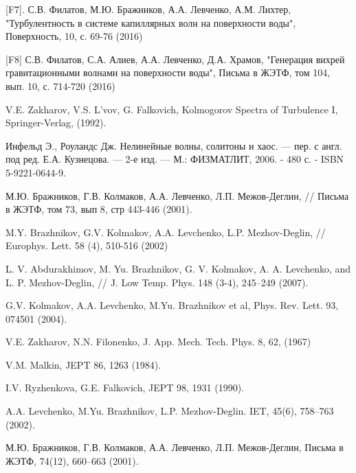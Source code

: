 [F7]. С.В. Филатов, М.Ю. Бражников, А.А. Левченко,  А.М. Лихтер, "Турбулентность в системе капиллярных волн на поверхности воды", Поверхность, 10, с. 69-76 (2016)

[F8] С.В. Филатов, С.А. Алиев, А.А. Левченко, Д.А. Храмов, "Генерация вихрей гравитационными волнами на поверхности воды", Письма в ЖЭТФ, том 104, вып.  10, с. 714-720 (2016)


\begin{thebibliography}{99}

V.E. Zakharov, V.S. L'vov, G. Falkovich, Kolmogorov Spectra of Turbulence I, Springer-Verlag, (1992).

Инфельд Э., Роуландс Дж. Нелинейные волны, солитоны и 
хаос. — пер. с англ. под ред. Е.А. Кузнецова. — 2-е изд. — М.: ФИЗМАТЛИТ, 
2006. - 480 с. - ISBN 5-9221-0644-9. 


М.Ю. Бражников, Г.В. Колмаков, А.А. Левченко, Л.П. Межов-Деглин, %
// Письма в ЖЭТФ, том 73, вып 8, стр 443-446 (2001).

M.Y. Brazhnikov, G.V. Kolmakov, A.A. Levchenko, L.P. Mezhov-Deglin, %
// Europhys. Lett. 58 (4), 510-516 (2002) 

L. V. Abdurakhimov, M. Yu. Brazhnikov, G. V. Kolmakov, A. A. Levchenko, and L. P. Mezhov-Deglin, %
// J. Low Temp. Phys. 148 (3-4), 245--249 (2007). 
 
G.V. Kolmakov, A.A. Levchenko, M.Yu. Brazhnikov et al, Phys. Rev. Lett. 93, 074501 (2004).

V.E. Zakharov, N.N. Filonenko, J. App. Mech. Tech. Phys. 8, 62, (1967)

V.M. Malkin, JEPT 86, 1263 (1984).

I.V. Ryzhenkova, G.E. Falkovich, JEPT 98, 1931 (1990).

A.A. Levchenko, M.Yu. Brazhnikov, L.P. Mezhov-Deglin. 
IET, 45(6), 758–763 (2002).

М.Ю. Бражников, Г.В. Колмаков, А.А. Левченко, Л.П. Межов-Деглин,%
Письма в ЖЭТФ, 74(12), 660–663 (2001).


\end{thebibliography}
